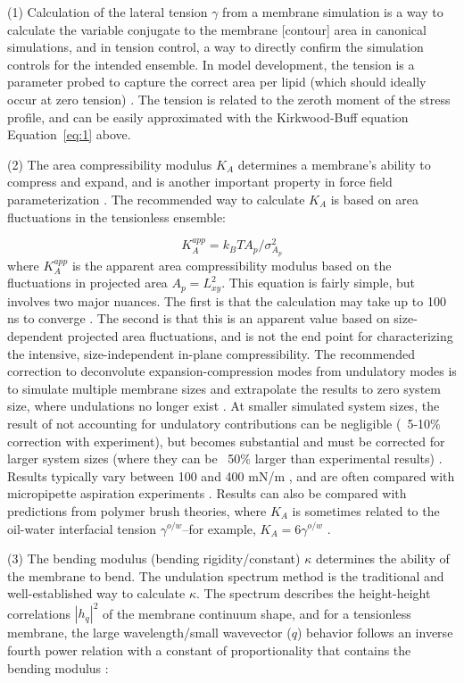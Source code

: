 \documentclass[9pt,bestpractices]{livecoms}
\begin{document}
(1) Calculation of the lateral tension $\gamma$ from a membrane simulation is a way to calculate the variable conjugate to the membrane [contour] area in canonical simulations, and in tension control, a way to directly confirm the simulation controls for the intended ensemble.
In model development, the tension is a parameter probed to capture the correct area per lipid (which should ideally occur at zero tension) \cite{Zgorski2016}.
The tension is related to the zeroth moment of the stress profile, and can be easily approximated with the Kirkwood-Buff equation Equation~\ref{eq:1} above.

(2) The area compressibility modulus $K_A$ determines a membrane's ability to compress and expand, and is another important property in force field parameterization \cite{Venable2015}.
The recommended way to calculate $K_A$ is based on area fluctuations in the tensionless ensemble:

\begin{equation}\label{eq:7}
	K_A^{app} = k_BTA_p/\sigma_{A_p}^2
\end{equation}
where $K_A^{app}$ is the apparent area compressibility modulus based on the fluctuations in projected area $A_p=L_{xy}^2$.
This equation is fairly simple, but involves two major nuances.
The first is that the calculation may take up to 100 ns to converge \cite{Venable2015}.
The second is that this is an apparent value based on size-dependent projected area fluctuations, and is not the end point for characterizing the intensive, size-independent in-plane compressibility.
The recommended correction to deconvolute expansion-compression modes from undulatory modes is to simulate multiple membrane sizes and extrapolate the results to zero system size, where undulations no longer exist \cite{Waheed2009}.
At smaller simulated system sizes, the result of not accounting for undulatory contributions can be negligible (~5-10\% correction with experiment), but becomes substantial and must be corrected for larger system sizes (where they can be ~50\% larger than experimental results) \cite{Waheed2009,Venable2015}.
Results typically vary between 100 and 400 mN/m \cite{Venable2015}, and are often compared with micropipette aspiration experiments \cite{Rawicz2000}.
Results can also be compared with predictions from polymer brush theories, where $K_A$ is sometimes related to the oil-water interfacial tension $\gamma^{o/w}$--for example, $K_A = 6 \gamma^{o/w}$ \cite{Rawicz2000}.

(3) The bending modulus (bending rigidity/constant) $\kappa$ determines the ability of the membrane to bend.
The undulation spectrum method \cite{Goetz1999,Lindahl2000} is the traditional and well-established way to calculate $\kappa$.
The spectrum describes the height-height correlations $\left|h_q\right|^2$ of the membrane continuum shape, and for a tensionless membrane, the large wavelength/small wavevector ($q$) behavior follows an inverse fourth power relation with a constant of proportionality that contains the bending modulus \cite{Goetz1999,Lindahl2000}:
\end{document}
